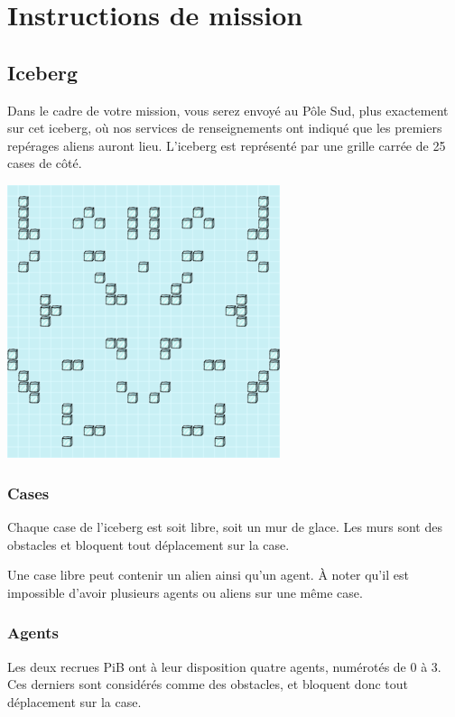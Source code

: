 \section{Instructions de mission}\label{instructions-de-mission}

\subsection{Iceberg}\label{iceberg}

Dans le cadre de votre mission, vous serez envoyé au Pôle Sud, plus
exactement sur cet iceberg, où nos services de renseignements ont
indiqué que les premiers repérages aliens auront lieu. L'iceberg est
représenté par une grille carrée de 25 cases de côté.

\begin{center}
\includegraphics[width=8cm]{../subject/img/map.png}
\end{center}

\subsubsection{Cases}\label{cases}

Chaque case de l'iceberg est soit libre, soit un mur de glace. Les murs
sont des obstacles et bloquent tout déplacement sur la case.

Une case libre peut contenir un alien ainsi qu'un agent. À noter qu'il
est impossible d'avoir plusieurs agents ou aliens sur une même case.

\subsubsection{Agents}\label{agents}

Les deux recrues PiB ont à leur disposition quatre agents, numérotés de
0 à 3. Ces derniers sont considérés comme des obstacles, et bloquent
donc tout déplacement sur la case.


